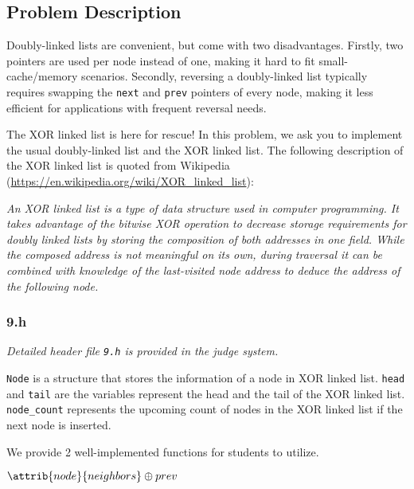 \setcounter{secnumdepth}{0}

\subsection{Problem Description}\label{problem-description}

Doubly-linked lists are convenient, but come with two disadvantages. Firstly, two pointers are used per node instead of one, making it hard to fit small-cache/memory scenarios. Secondly, reversing a doubly-linked list typically requires swapping the \texttt{next} and \texttt{prev} pointers of every node, making it less efficient for applications with frequent reversal needs.

The XOR linked list is here for rescue! In this problem, we ask you to implement the usual doubly-linked list and the XOR linked list. The following description of the XOR linked list is quoted from Wikipedia (\url{https://en.wikipedia.org/wiki/XOR_linked_list}): 

{\it
An XOR linked list is a type of data structure used in computer programming. It takes advantage of the bitwise XOR operation to decrease storage requirements for doubly linked lists by storing the composition of both addresses in one field. While the composed address is not meaningful on its own, during traversal it can be combined with knowledge of the last-visited node address to deduce the address of the following node.
}

\subsubsection{9.h}\label{9.h}

{\it Detailed header file \texttt{9.h} is provided in the judge system.}

\bigskip

\noindent\texttt{Node} is a structure that stores the information of a node in XOR linked list. \texttt{head} and \texttt{tail} are the variables represent the head and the tail of the XOR linked list. \texttt{node\_count} represents the upcoming count of nodes in the XOR linked list if the next node is inserted.

\noindent We provide 2 well-implemented functions for students to utilize.

\begin{codebox}
\li \Return $\attrib{node}{neighbors} \oplus prev$
\End
\end{codebox}


